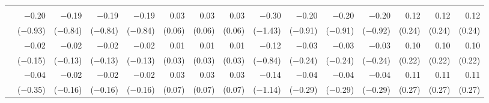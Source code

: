 \begin{tabularx}{1.45\textwidth}{lRRRRRRRRRRRRRR}
		\midrule
		 \\[\panelspacing]
		 & \num{-0.20}\phantom{***)} & \num{-0.19}\phantom{***)} & \num{-0.19}\phantom{***)} & \num{-0.19}\phantom{***)} & \num{0.03}\phantom{***)} & \num{0.03}\phantom{***)} & \num{0.03}\phantom{***)} & \num{-0.30}\phantom{***)} & \num{-0.20}\phantom{***)} & \num{-0.20}\phantom{***)} & \num{-0.20}\phantom{***)} & \num{0.12}\phantom{***)} & \num{0.12}\phantom{***)} & \num{0.12}\phantom{***)} \\
		 & (\num{-0.93})\phantom{***} & (\num{-0.84})\phantom{***} & (\num{-0.84})\phantom{***} & (\num{-0.84})\phantom{***} & (\num{0.06})\phantom{***} & (\num{0.06})\phantom{***} & (\num{0.06})\phantom{***} & (\num{-1.43})\phantom{***} & (\num{-0.91})\phantom{***} & (\num{-0.91})\phantom{***} & (\num{-0.92})\phantom{***} & (\num{0.24})\phantom{***} & (\num{0.24})\phantom{***} & (\num{0.24})\phantom{***} \\ [\dspacing]
		 & \num{-0.02}\phantom{***)} & \num{-0.02}\phantom{***)} & \num{-0.02}\phantom{***)} & \num{-0.02}\phantom{***)} & \num{0.01}\phantom{***)} & \num{0.01}\phantom{***)} & \num{0.01}\phantom{***)} & \num{-0.12}\phantom{***)} & \num{-0.03}\phantom{***)} & \num{-0.03}\phantom{***)} & \num{-0.03}\phantom{***)} & \num{0.10}\phantom{***)} & \num{0.10}\phantom{***)} & \num{0.10}\phantom{***)} \\
		 & (\num{-0.15})\phantom{***} & (\num{-0.13})\phantom{***} & (\num{-0.13})\phantom{***} & (\num{-0.13})\phantom{***} & (\num{0.03})\phantom{***} & (\num{0.03})\phantom{***} & (\num{0.03})\phantom{***} & (\num{-0.84})\phantom{***} & (\num{-0.24})\phantom{***} & (\num{-0.24})\phantom{***} & (\num{-0.24})\phantom{***} & (\num{0.22})\phantom{***} & (\num{0.22})\phantom{***} & (\num{0.22})\phantom{***} \\ [\dspacing]
		 & \num{-0.04}\phantom{***)} & \num{-0.02}\phantom{***)} & \num{-0.02}\phantom{***)} & \num{-0.02}\phantom{***)} & \num{0.03}\phantom{***)} & \num{0.03}\phantom{***)} & \num{0.03}\phantom{***)} & \num{-0.14}\phantom{***)} & \num{-0.04}\phantom{***)} & \num{-0.04}\phantom{***)} & \num{-0.04}\phantom{***)} & \num{0.11}\phantom{***)} & \num{0.11}\phantom{***)} & \num{0.11}\phantom{***)} \\
		 & (\num{-0.35})\phantom{***} & (\num{-0.16})\phantom{***} & (\num{-0.16})\phantom{***} & (\num{-0.16})\phantom{***} & (\num{0.07})\phantom{***} & (\num{0.07})\phantom{***} & (\num{0.07})\phantom{***} & (\num{-1.14})\phantom{***} & (\num{-0.29})\phantom{***} & (\num{-0.29})\phantom{***} & (\num{-0.29})\phantom{***} & (\num{0.27})\phantom{***} & (\num{0.27})\phantom{***} & (\num{0.27})\phantom{***} \\ [\dspacing]

\end{tabularx}
